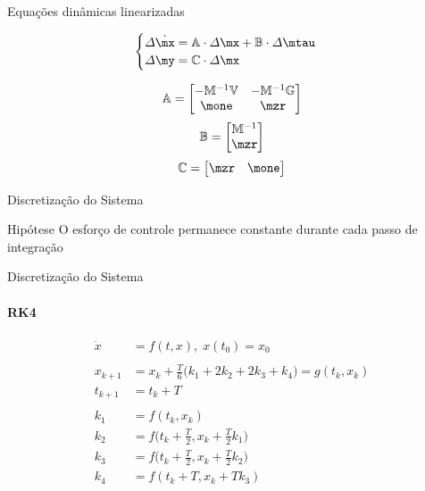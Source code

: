 \documentclass[25pt,landscape]{beamer}
\begin{document}
\begin{frame}{Equa\c{c}\~oes din\^amicas linearizadas}
    \begin{block}{}
		\begin{equation}
			\begin{cases}
				\Delta\dot{\mx} = \mA \cdot \Delta\mx + \mB \cdot \Delta\mtau \\
				\Delta\my = \mC \cdot \Delta\mx
			\end{cases}
		\end{equation}
		
		
		\begin{equation}
			\mA = \begin{bmatrix}
			-\mM^{-1} \mV& -\mM^{-1} \mG \\
			\mone & \mzr
			\end{bmatrix}
		\end{equation}
		\begin{equation}
			\mB = \begin{bmatrix}
			\mM^{-1} \\
			\mzr
			\end{bmatrix}
		\end{equation}
		\begin{equation}
			\mC = \begin{bmatrix}
			\mzr & \mone
			\end{bmatrix}
		\end{equation}
    \end{block}
\end{frame}

\begin{frame}{Discretiza\c{c}\~ao do Sistema}
    \begin{block}{Hipótese}
		O esfor\c{c}o de controle permanece constante durante cada passo de integra\c{c}\~ao
    \end{block}
\end{frame}

\begin{frame}{Discretiza\c{c}\~ao do Sistema}
	\framesubtitle{RK4}
    \begin{block}{}
		\begin{equation}
			\begin{align*}
				\dot{x} &=  f(t, x), \; x(t_0) = x_0 \\
				\\
				x_{k+1} &=  x_k + \frac{T}{6} \Big( k_1 + 2 k_2 + 2 k_3 + k_4 \Big) = g(t_k, x_k) \\
				t_{k+1} &=  t_k + T \\
				\\
				k_1 &=  f(t_k, x_k) \\
				k_2 &=  f \Big( t_k + \frac{T}{2}, x_k + \frac{T}{2} k_1 \Big) \\
				k_3 &=  f \Big( t_k + \frac{T}{2}, x_k + \frac{T}{2} k_2 \Big) \\
				k_4 &=  f(t_k + T, x_k + T k_3) \\
			\end{align*}
		\end{equation}
    \end{block}
\end{frame}
\end{document}
